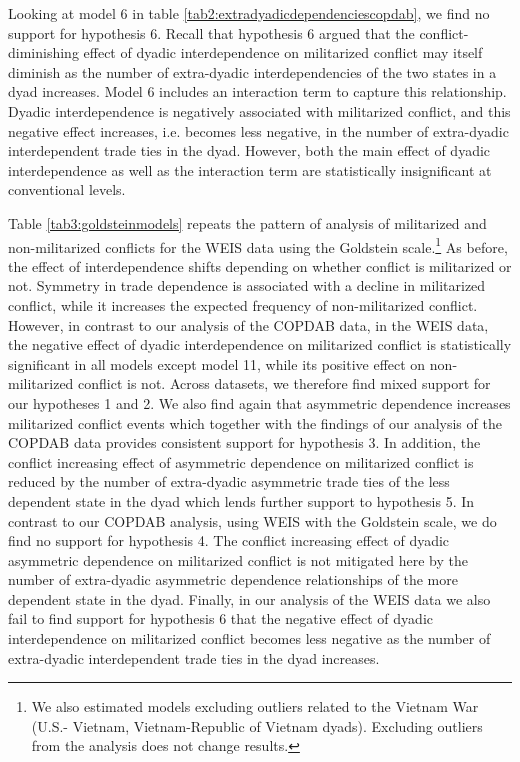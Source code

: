 \documentclass[12pt]{article}
\theoremstyle{hypothesis}
\begin{document}
Looking at model 6 in table \ref{tab2:extradyadicdependenciescopdab}, we find no support for hypothesis 6. Recall that hypothesis 6 argued that the conflict-diminishing effect of dyadic interdependence on militarized conflict may itself diminish as the number of extra-dyadic interdependencies of the two states in a dyad increases. Model 6 includes an interaction term to capture this relationship. Dyadic interdependence is negatively associated with militarized conflict, and this negative effect increases, i.e. becomes less negative, in the number of extra-dyadic interdependent trade ties in the dyad. However, both the main effect of dyadic interdependence as well as the interaction term are statistically insignificant at conventional levels.



Table \ref{tab3:goldsteinmodels} repeats the pattern of analysis of militarized and non-militarized conflicts for the WEIS data using the Goldstein scale.\footnote{We also estimated models excluding outliers related to the Vietnam War (U.S.- Vietnam, Vietnam-Republic of Vietnam dyads). Excluding outliers from the analysis does not change results.} As before, the effect of interdependence shifts depending on whether conflict is militarized or not. Symmetry in trade dependence is associated with a decline in militarized conflict, while it increases the expected frequency of non-militarized conflict. However, in contrast to our analysis of the COPDAB data, in the WEIS data, the negative effect of dyadic interdependence on militarized conflict is statistically significant in all models except model 11, while its positive effect on non-militarized conflict is not. Across datasets, we therefore find mixed support for our hypotheses 1 and 2. We also find again that asymmetric dependence increases militarized conflict events which together with the findings of our analysis of the COPDAB data provides consistent support for hypothesis 3. In addition, the conflict increasing effect of asymmetric dependence on militarized conflict is reduced by the number of extra-dyadic asymmetric trade ties of the less dependent state in the dyad which lends further support to hypothesis 5. In contrast to our COPDAB analysis, using WEIS with the Goldstein scale, we do find no support for hypothesis 4. The conflict increasing effect of dyadic asymmetric dependence on militarized conflict is not mitigated here by the number of extra-dyadic asymmetric dependence relationships of the more dependent state in the dyad. Finally, in our analysis of the WEIS data we also fail to find support for hypothesis 6 that the negative effect of dyadic interdependence on militarized conflict becomes less negative as the number of  extra-dyadic interdependent trade ties in the dyad increases.
\end{document}
